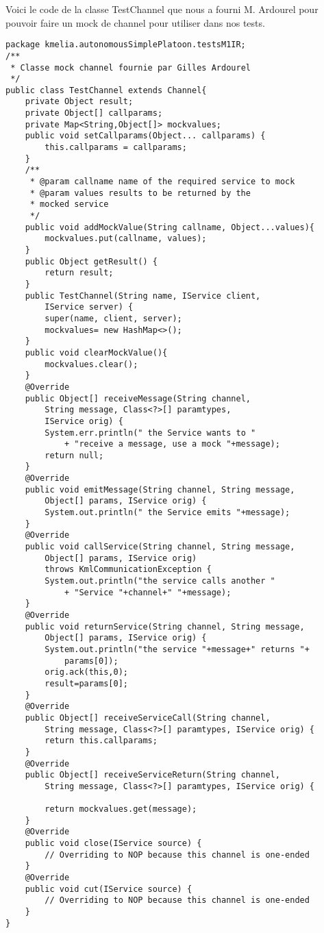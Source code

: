 Voici le code de la classe TestChannel que nous a fourni M. Ardourel pour pouvoir faire un mock de channel pour utiliser dans nos tests.
\begin{lstlisting}[frame=single, caption={TestChannel.java},label=fig:JUnitTestChannel]
package kmelia.autonomousSimplePlatoon.testsM1IR;
/**
 * Classe mock channel fournie par Gilles Ardourel
 */
public class TestChannel extends Channel{
    private Object result;
    private Object[] callparams;
    private Map<String,Object[]> mockvalues;
    public void setCallparams(Object... callparams) {
    	this.callparams = callparams;
    }   
    /**
     * @param callname name of the required service to mock
     * @param values results to be returned by the
     * mocked service
     */
    public void addMockValue(String callname, Object...values){
    	mockvalues.put(callname, values);
    }    
    public Object getResult() {
    	return result;
    }    
    public TestChannel(String name, IService client,
        IService server) {
    	super(name, client, server);
    	mockvalues= new HashMap<>();
    }    
    public void clearMockValue(){
    	mockvalues.clear();
    }    
    @Override
    public Object[] receiveMessage(String channel, 
        String message, Class<?>[] paramtypes,
        IService orig) {
    	System.err.println(" the Service wants to "
    	    + "receive a message, use a mock "+message);
    	return null;
    }    
    @Override
    public void emitMessage(String channel, String message, 
        Object[] params, IService orig) {
    	System.out.println(" the Service emits "+message);
    }    
    @Override
    public void callService(String channel, String message, 
        Object[] params, IService orig)
        throws KmlCommunicationException {
    	System.out.println("the service calls another "
    	    + "Service "+channel+" "+message);
    }    
    @Override
    public void returnService(String channel, String message, 
        Object[] params, IService orig) {
    	System.out.println("the service "+message+" returns "+
    	    params[0]);
    	orig.ack(this,0);
    	result=params[0]; 
    }    
    @Override
    public Object[] receiveServiceCall(String channel, 
        String message, Class<?>[] paramtypes, IService orig) {
    	return this.callparams;
    }    
    @Override
    public Object[] receiveServiceReturn(String channel, 
        String message, Class<?>[] paramtypes, IService orig) {
    	
        return mockvalues.get(message);
    }    
    @Override
    public void close(IService source) {
    	// Overriding to NOP because this channel is one-ended
    }    
    @Override
    public void cut(IService source) {
    	// Overriding to NOP because this channel is one-ended
    }
}
\end{lstlisting}

